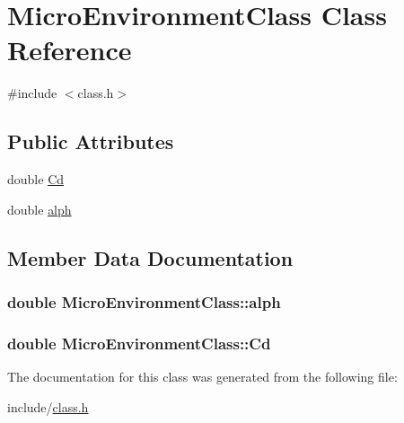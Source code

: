 \hypertarget{class_micro_environment_class}{}\section{Micro\+Environment\+Class Class Reference}
\label{class_micro_environment_class}


{\ttfamily \#include $<$class.\+h$>$}

\subsection*{Public Attributes}
\begin{DoxyCompactItemize}
\item 
double \hyperlink{class_micro_environment_class_a1e5e5e67d1e4ec938168e856b3da8a81}{Cd}
\item 
double \hyperlink{class_micro_environment_class_ab045d42f605b21d1e4bb766745845b3c}{alph}
\end{DoxyCompactItemize}


\subsection{Member Data Documentation}
\subsubsection[{\texorpdfstring{alph}{alph}}]{\setlength{\rightskip}{0pt plus 5cm}double Micro\+Environment\+Class\+::alph}\hypertarget{class_micro_environment_class_ab045d42f605b21d1e4bb766745845b3c}{}\label{class_micro_environment_class_ab045d42f605b21d1e4bb766745845b3c}
\subsubsection[{\texorpdfstring{Cd}{Cd}}]{\setlength{\rightskip}{0pt plus 5cm}double Micro\+Environment\+Class\+::\+Cd}\hypertarget{class_micro_environment_class_a1e5e5e67d1e4ec938168e856b3da8a81}{}\label{class_micro_environment_class_a1e5e5e67d1e4ec938168e856b3da8a81}


The documentation for this class was generated from the following file\+:\begin{DoxyCompactItemize}
\item 
include/\hyperlink{class_8h}{class.\+h}\end{DoxyCompactItemize}
